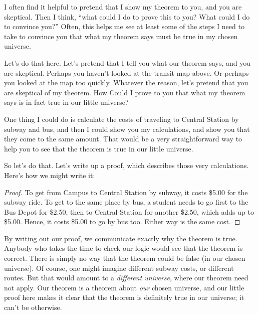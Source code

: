 \documentclass[../../../main.tex]{subfiles}
\begin{document}
I often find it helpful to pretend that I show my theorem to you, and you are skeptical. Then I think, ``what could I do to prove this to you? What could I do to convince you?'' Often, this helps me see at least some of the steps I need to take to convince you that what my theorem says must be true in my chosen universe. 

Let's do that here. Let's pretend that I tell you what our theorem says, and you are skeptical. Perhaps you haven't looked at the transit map above. Or perhaps you looked at the map too quickly. Whatever the reason, let's pretend that you are skeptical of my theorem. How Could I prove to you that what my theorem says is in fact true in our little universe?

One thing I could do is calculate the costs of traveling to Central Station by subway and bus, and then I could show you my calculations, and show you that they come to the same amount. That would be a very straightforward way to help you to see that the theorem is true in our little universe.

So let's do that. Let's write up a proof, which describes those very calculations. Here's how we might write it:

\begin{framed}
  \begin{proof}
  To get from Campus to Central Station by subway, it costs \$5.00 for the subway ride. To get to the same place by bus, a student needs to go first to the Bus Depot for \$2.50, then to Central Station for another \$2.50, which adds up to \$5.00. Hence, it costs \$5.00 to go by bus too. Either way is the same cost.
  \end{proof}
\end{framed}

\begin{aside}
  \begin{remark}
    By writing out our proof, we communicate exactly why the theorem is true. Anybody who takes the time to check our logic would see that the theorem is correct. There is simply no way that the theorem could be false (in our chosen universe). Of course, one might imagine different subway costs, or different routes. But that would amount to a \emph{different universe}, where our theorem need not apply. Our theorem is a theorem about \emph{our} chosen universe, and our little proof here makes it clear that the theorem is definitely true in our universe; it can't be otherwise.
  \end{remark}
\end{aside}
\end{document}
